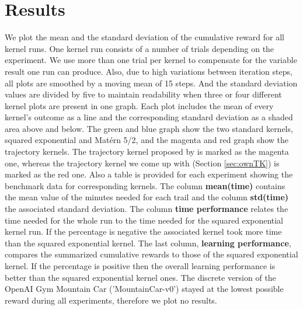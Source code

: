 \chapter{Results}
\label{chap:5}
%
We plot the mean and the standard deviation of the cumulative reward for all kernel runs. One kernel run consists of a number of trials depending on the experiment. We use more than one trial per kernel to compensate for the variable result one run can produce. Also, due to high variations between iteration steps, all plots are smoothed by a moving mean of 15 steps. And the standard deviation values are divided by five to maintain readability when three or four different kernel plots are present in one graph. Each plot includes the mean of every kernel's outcome as a line and the corresponding standard deviation as a shaded area above and below. The green and blue graph show the two standard kernels, squared exponential and Matérn 5/2, and the magenta and red graph show the trajectory kernels. The trajectory kernel proposed by \cite{wilson2014using} is marked as the magenta one, whereas the trajectory kernel we come up with (Section \ref{sec:ownTK}) is marked as the red one. Also a table is provided for each experiment showing the benchmark data for corresponding kernels. The column \textbf{mean(time)} contains the mean value of the minutes needed for each trail and the column \textbf{std(time)} the associated standard deviation. The column \textbf{time performance} relates the time needed for the whole run to the time needed for the squared exponential kernel run. If the percentage is negative the associated kernel took more time than the squared exponential kernel. The last column, \textbf{learning performance}, compares the summarized cumulative rewards to those of the squared exponential kernel. If the percentage is positive then the overall learning performance is better than the squared exponential kernel ones. The discrete version of the OpenAI Gym Mountain Car ('MountainCar-v0') stayed at the lowest possible reward during all experiments, therefore we plot no results.

